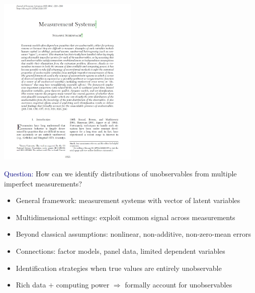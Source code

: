 \documentclass[aspectratio=169]{beamer}
\begin{document}
\begin{frame}
\centering
\includegraphics[width=0.5\textwidth]{Schennach_2022_JEL_cover.jpg}
\end{frame}

\begin{frame}
\textcolor{navy}{Question:} How can we identify distributions of unobservables from multiple imperfect measurements?
\bigskip

\begin{itemize}
\itemsep1.5em
\item<2-> General framework: measurement systems with vector of latent variables
\item<3-> Multidimensional settings: exploit common signal across measurements
\item<4-> Beyond classical assumptions: nonlinear, non-additive, non-zero-mean errors
\item<5-> Connections: factor models, panel data, limited dependent variables
\item<6-> Identification strategies when true values are entirely unobservable
\item<7-> Rich data $+$ computing power $\Rightarrow$ formally account for unobservables
\end{itemize}
\end{frame}
\end{document}
